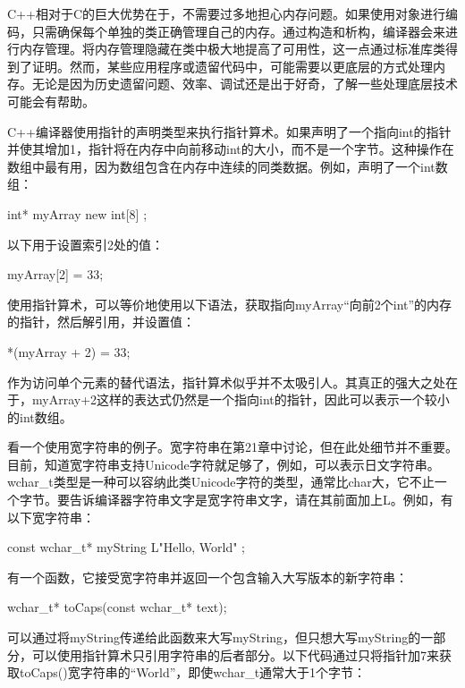 
C++相对于C的巨大优势在于，不需要过多地担心内存问题。如果使用对象进行编码，只需确保每个单独的类正确管理自己的内存。通过构造和析构，编译器会来进行内存管理。将内存管理隐藏在类中极大地提高了可用性，这一点通过标准库类得到了证明。然而，某些应用程序或遗留代码中，可能需要以更底层的方式处理内存。无论是因为历史遗留问题、效率、调试还是出于好奇，了解一些处理底层技术可能会有帮助。


C++编译器使用指针的声明类型来执行指针算术。如果声明了一个指向int的指针并使其增加1，指针将在内存中向前移动int的大小，而不是一个字节。这种操作在数组中最有用，因为数组包含在内存中连续的同类数据。例如，声明了一个int数组：

\begin{cpp}
int* myArray { new int[8] };
\end{cpp}

以下用于设置索引2处的值：

\begin{cpp}
myArray[2] = 33;
\end{cpp}

使用指针算术，可以等价地使用以下语法，获取指向myArray“向前2个int”的内存的指针，然后解引用，并设置值：

\begin{cpp}
*(myArray + 2) = 33;
\end{cpp}

作为访问单个元素的替代语法，指针算术似乎并不太吸引人。其真正的强大之处在于，myArray+2这样的表达式仍然是一个指向int的指针，因此可以表示一个较小的int数组。

看一个使用宽字符串的例子。宽字符串在第21章中讨论，但在此处细节并不重要。目前，知道宽字符串支持Unicode字符就足够了，例如，可以表示日文字符串。wchar\_t类型是一种可以容纳此类Unicode字符的类型，通常比char大，它不止一个字节。要告诉编译器字符串文字是宽字符串文字，请在其前面加上L。例如，有以下宽字符串：

\begin{cpp}
const wchar_t* myString { L"Hello, World" };
\end{cpp}

有一个函数，它接受宽字符串并返回一个包含输入大写版本的新字符串：

\begin{cpp}
wchar_t* toCaps(const wchar_t* text);
\end{cpp}

可以通过将myString传递给此函数来大写myString，但只想大写myString的一部分，可以使用指针算术只引用字符串的后者部分。以下代码通过只将指针加7来获取toCaps()宽字符串的“World”，即使wchar\_t通常大于1个字节：

